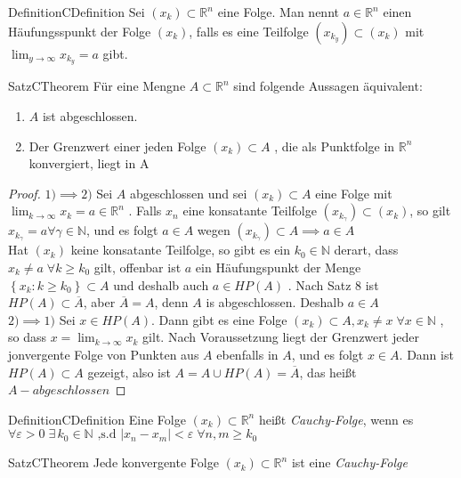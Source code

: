 \documentclass[a4paper]{memoir}
\begin{document}
\begin{ibox}{Definition}{CDefinition}
     Sei $ \left( x_k \right) \subset \mathbb{R}^n $ eine Folge. Man nennt $ a \in \mathbb{R}^n $ einen Häufungsspunkt der Folge
	 $ \left( x_{k} \right)  $, falls es eine Teilfolge $ \left( x_{k_{y}} \right) \subset \left( x_{k} \right)  $ mit 
	 $ \lim_{y \to \infty }x_{k_{y}} = a  $ gibt.
\end{ibox}
\begin{ibox}[10]{Satz}{CTheorem}
    Für eine Mengne $ A \subset \mathbb{R}^n $ sind folgende Aussagen äquivalent:
	\begin{enumerate}[label=\alph*)]
		\item $ A $ ist abgeschlossen.	
		\item Der Grenzwert einer jeden Folge $ \left( x_{k} \right) \subset A $ , die als Punktfolge in $ \mathbb{R}^n $ konvergiert,
			liegt in A
	\end{enumerate}
\end{ibox}
\begin{proof}
	$ 1) \implies 2) $ Sei $ A $ abgeschlossen und sei $  \left( x_{k} \right) \subset A $ eine Folge mit $ \lim_{k \to \infty } x_k =
	a \in \mathbb{R}^n	$ . Falls $  x_n $ eine konsatante Teilfolge $\left(  x_{k_{ \gamma} } \right) \subset \left( x_k \right)  $,
	so gilt $ x_{k_{ \gamma}} = a \forall \gamma \in \mathbb{N} $, und es folgt $ a \in A $ wegen $ \left( x_{k_{ \gamma}} \right) 
	\subset A  \implies a \in A $ \\
	Hat $ \left( x_k \right) $ keine konsatante Teilfolge, so gibt es ein $ k_0 \in \mathbb{N} $ derart, dass $ x_k \neq a \; \forall
	k \geq k_0$ gilt, offenbar ist $ a $  ein Häufungspunkt der Menge $ \left\{ x_{k}: k \geq k_0 \right\} \subset A $ und deshalb auch
	$ a \in HP(A) $ . Nach Satz 8 ist $ HP(A) \subset \overline{A} $, aber $ \overline{A} = A  $, denn $ A  $ is abgeschlossen. 
	Deshalb $ a \in A $ \\
	$ 2) \implies 1) $ Sei $ x \in HP(A) $. Dann gibt es eine Folge $ \left( x_k \right) \subset A, x_k \neq x \; \forall x \in \mathbb{N} $
	, so dass $ x = \lim_{k \to \infty}x_k $ gilt. Nach Voraussetzung liegt der Grenzwert jeder jonvergente Folge von Punkten aus $ A $ 
	ebenfalls in $ A $, und es folgt $ x \in A $. Dann ist $ HP(A) \subset A $ gezeigt, also ist $ A = A \cup HP(A) = \overline{A} $,
	das heißt $ A-abgeschlossen $ 
\end{proof}

\begin{ibox}{Definition}{CDefinition}
    Eine Folge $ \left( x_k \right)\subset\mathbb{R}^n$ heißt \textit{Cauchy-Folge}, wenn es $ \forall\varepsilon>0 \; \exists\, k_0 
	\in \mathbb{N} \text{ ,s.d } \left|x_n - x_m \right| < \varepsilon \;\forall n,m \geq k_0$ 
\end{ibox}
\begin{ibox}[11]{Satz}{CTheorem}
    Jede konvergente Folge $\left(  x_k  \right) \subset \mathbb{R}^n$ ist eine \textit{Cauchy-Folge}
\end{ibox}
\end{document}

